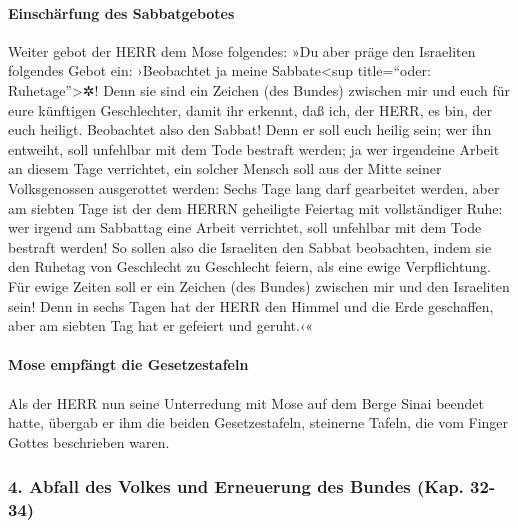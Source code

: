 \hypertarget{einschuxe4rfung-des-sabbatgebotes}{%
\paragraph{Einschärfung des
Sabbatgebotes}\label{einschuxe4rfung-des-sabbatgebotes}}

 Weiter gebot der HERR dem Mose folgendes:
 »Du aber präge den Israeliten folgendes Gebot ein:
›Beobachtet ja meine Sabbate\textless sup title=``oder:
Ruhetage''\textgreater✲! Denn sie sind ein Zeichen (des Bundes) zwischen
mir und euch für eure künftigen Geschlechter, damit ihr erkennt, daß
ich, der HERR, es bin, der euch heiligt.  Beobachtet also
den Sabbat! Denn er soll euch heilig sein; wer ihn entweiht, soll
unfehlbar mit dem Tode bestraft werden; ja wer irgendeine Arbeit an
diesem Tage verrichtet, ein solcher Mensch soll aus der Mitte seiner
Volksgenossen ausgerottet werden:  Sechs Tage lang darf
gearbeitet werden, aber am siebten Tage ist der dem HERRN geheiligte
Feiertag mit vollständiger Ruhe: wer irgend am Sabbattag eine Arbeit
verrichtet, soll unfehlbar mit dem Tode bestraft werden! 
So sollen also die Israeliten den Sabbat beobachten, indem sie den
Ruhetag von Geschlecht zu Geschlecht feiern, als eine ewige
Verpflichtung.  Für ewige Zeiten soll er ein Zeichen (des
Bundes) zwischen mir und den Israeliten sein! Denn in sechs Tagen hat
der HERR den Himmel und die Erde geschaffen, aber am siebten Tag hat er
gefeiert und geruht.‹«

\hypertarget{mose-empfuxe4ngt-die-gesetzestafeln}{%
\paragraph{Mose empfängt die
Gesetzestafeln}\label{mose-empfuxe4ngt-die-gesetzestafeln}}

 Als der HERR nun seine Unterredung mit Mose auf dem
Berge Sinai beendet hatte, übergab er ihm die beiden Gesetzestafeln,
steinerne Tafeln, die vom Finger Gottes beschrieben waren.

\hypertarget{abfall-des-volkes-und-erneuerung-des-bundes-kap.-32-34}{%
\subsubsection{4. Abfall des Volkes und Erneuerung des Bundes (Kap.
32-34)}\label{abfall-des-volkes-und-erneuerung-des-bundes-kap.-32-34}}

